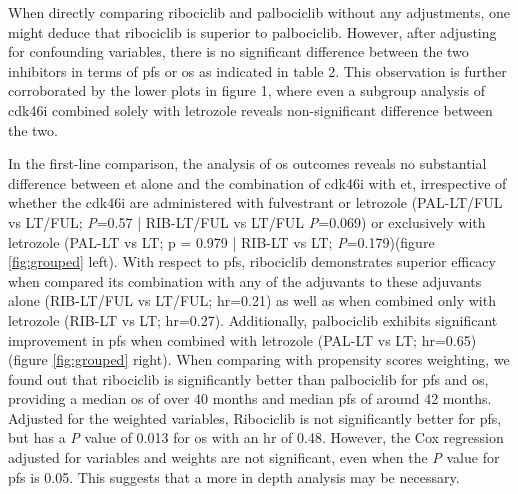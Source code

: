 When directly comparing ribociclib and palbociclib without any adjustments, one might deduce that ribociclib is superior to palbociclib. However, after adjusting for confounding variables, there is no significant difference between the two inhibitors in terms of \ac{pfs} or \ac{os} as indicated in table 2. This observation is further corroborated by the lower plots in figure 1, where even a subgroup analysis of \ac{cdk46i} combined solely with letrozole reveals non-significant difference between the two.

In the first-line comparison, the analysis of \ac{os} outcomes reveals no substantial difference between \ac{et} alone and the combination of \ac{cdk46i} with \ac{et}, irrespective of whether the \ac{cdk46i} are administered with fulvestrant or letrozole  (PAL-LT/FUL vs LT/FUL; \textit{P}=0.57 | RIB-LT/FUL vs LT/FUL \textit{P}=0.069) or exclusively with letrozole (PAL-LT vs LT; p = 0.979 | RIB-LT vs LT; \textit{P}=0.179)(figure \ref{fig:grouped} left). With respect to \ac{pfs}, ribociclib demonstrates superior efficacy when compared its combination with any of the adjuvants to these adjuvants alone (RIB-LT/FUL vs LT/FUL; \ac{hr}=0.21) as well as when combined only with letrozole (RIB-LT vs LT; \ac{hr}=0.27). Additionally, palbociclib exhibits significant improvement in \ac{pfs} when combined with letrozole  (PAL-LT vs LT; \ac{hr}=0.65) (figure \ref{fig:grouped} right).
When comparing with propensity scores weighting, we found out that ribociclib is significantly better than palbociclib for \ac{pfs} and \ac{os}, providing a median \ac{os} of over 40 months and median \ac{pfs} of around 42 months. Adjusted for the weighted variables, Ribociclib is not significantly better for \ac{pfs}, but has a \textit{P} value of 0.013 for \ac{os} with an \ac{hr} of 0.48. However, the Cox regression adjusted for variables and weights are not significant, even when the \textit{P} value for \ac{pfs} is 0.05. This suggests that a more in depth analysis may be necessary.


